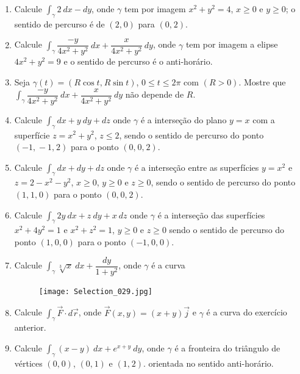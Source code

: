 \documentclass[11pt,a4paper]{article}
\begin{document}
\begin{enumerate}
\item Calcule $\displaystyle\int_\gamma 2 \ dx - dy$, onde $\gamma$ tem por imagem $x^2 + y^2 = 4$, $x \geq 0$ e $y \geq 0$; o sentido de percurso é de $(2 \textrm{,}\ 0)$ para $(0 \textrm{,}\ 2)$.

\item Calcule $\displaystyle\int_\gamma \dfrac{-y}{4x^2 + y^2} \ dx + \dfrac{x}{4x^2 + y^2} \ dy$, onde $\gamma$ tem por imagem a elipse $4x^2 + y^2 = 9$ e o sentido de percurso é o anti-horário.

\item Seja $\gamma(t) = (R\cos t \textrm{,}\ R\sin t)$, $0 \leq t \leq 2\pi$ com $(R > 0)$. Mostre que $\displaystyle\int_\gamma \dfrac{-y}{4x^2 + y^2} \ dx + \dfrac{x}{4x^2 + y^2} \ dy$ não depende de $R$.

\item Calcule $\displaystyle\int_\gamma dx + y \ dy + dz$ onde $\gamma$ é a interseção do plano $y = x$ com a superfície $z = x^2 + y^2$, $z \leq 2$, sendo o sentido de percurso do ponto $(-1 \textrm{,}\ -1 \textrm{,}\ 2)$ para o ponto $(0 \textrm{,}\ 0 \textrm{,}\ 2)$.

\item Calcule $\displaystyle\int_\gamma dx +  dy + dz$ onde $\gamma$ é a interseção entre as superfícies $y = x^2$ e $z = 2 - x^2 - y^2$, $x \geq 0$, $y \geq 0$ e $z \geq 0$, sendo o sentido de percurso do ponto $(1 \textrm{,}\ 1 \textrm{,}\ 0)$ para o ponto $(0 \textrm{,}\ 0 \textrm{,}\ 2)$.

\item Calcule $\displaystyle\int_\gamma 2y \ dx +  z \ dy + x \ dz$ onde $\gamma$ é a interseção das superfícies $x^2 + 4y^2 = 1$ e $x^2 + z^2 = 1$, $y \geq 0$ e $z \geq 0$ sendo o sentido de percurso do ponto $(1 \textrm{,}\ 0 \textrm{,}\ 0)$ para o ponto $(-1 \textrm{,}\ 0 \textrm{,}\ 0)$.

\item Calcule $\displaystyle\int_\gamma \sqrt[3]{x} \ dx + \dfrac{dy}{1 + y^2}$, onde $\gamma$ é a curva

\begin{figure}[h]	
\centering %
\texttt{[image: Selection\_029.jpg]} 
\end{figure}

\item Calcule $\displaystyle\int_\gamma \vec{F} \cdot d\vec{r}$, onde $\vec{F}(x,y) = (x + y)\vec{j}$ e $\gamma$ é a curva do exercício anterior. 

\item Calcule $\displaystyle\int_\gamma (x - y) \ dx + e^{x + y} \ dy$, onde $\gamma$ é a fronteira do triângulo de vértices $(0 \textrm{,}\ 0)$, $(0 \textrm{,}\ 1)$ e $(1 \textrm{,}\ 2)$. orientada no sentido anti-horário.


\end{enumerate}
\end{document}
